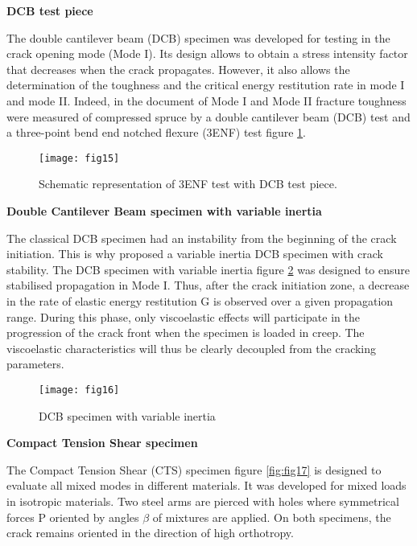 \textbf{DCB test piece}

The double cantilever beam (DCB) specimen was developed for testing in the crack opening mode (Mode I). Its design allows to obtain a stress intensity factor that decreases when the crack propagates. However, it also allows the determination of the toughness and the critical energy restitution rate in mode I and mode II. Indeed, in the document of \cite{YoshiharaandNobusue2008} Mode I and Mode II fracture toughness were measured of compressed spruce by a double cantilever beam (DCB) test and a three-point bend end notched flexure (3ENF) test figure \ref{fig:fig15}.


\begin{figure}[htp]
	\centering
	\texttt{[image: fig15]}
	\caption{Schematic representation of 3ENF test with DCB test piece. \cite{DavidsonandSun2005}}
	\label{fig:fig15}
\end{figure}

\newpage
\textbf{Double Cantilever Beam specimen with variable inertia}

The classical DCB specimen had an instability from the beginning of the crack initiation. This is why \cite{Dubois2002} proposed a variable inertia DCB specimen with crack stability. The DCB specimen with variable inertia figure \ref{fig:fig16} was designed to ensure stabilised propagation in Mode I. Thus, after the crack initiation zone, a decrease in the rate of elastic energy restitution G is observed over a given propagation range. During this phase, only viscoelastic effects will participate in the progression of the crack front when the specimen is loaded in creep. The viscoelastic characteristics will thus be clearly decoupled from the cracking parameters. 


\begin{figure}[htp]
	\centering
	\texttt{[image: fig16]}
	\caption{DCB specimen with variable inertia \cite{Dubois2002}}
	\label{fig:fig16}
\end{figure}


\textbf{Compact Tension Shear specimen}

The Compact Tension Shear (CTS) specimen figure \ref{fig:fig17} is designed to evaluate all mixed modes in different materials. It was developed for mixed loads in isotropic materials. Two steel arms are pierced with holes where symmetrical forces P oriented by angles $\beta$ of mixtures are applied. On both specimens, the crack remains oriented in the direction of high orthotropy.

